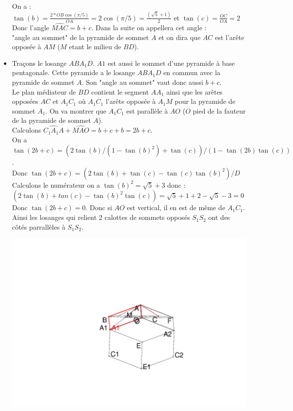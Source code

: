 \documentclass[a4paper,11pt]{book}
\begin{document}
\begin{itemize}
On a :\\
$\tan(b)=\frac{2*OB\cos(\pi/5)}{OA}=2\cos(\pi/5)=\frac{(\sqrt 5+1)}{2}$ et $\tan(c)=\frac{OC}{OA}=2$
Donc l'angle $\widehat{MAC}=b+c$. Dans la suite on appellera cet angle :\\
"angle au sommet" de la pyramide de sommet $A$ et on dira que $AC$ est 
l'ar\^ete oppos\'ee \`a $AM$ ($M$ etant le milieu de $BD$).\\
\item Tra\c{c}ons le losange $ABA_1D$. $A1$ est aussi le sommet d'une pyramide 
\`a base pentagonale. Cette pyramide a le losange $ABA_1D$ en commun avec la 
pyramide de sommet $A$. Son "angle au sommet" vaut donc aussi $b+c$.\\
Le plan m\'ediateur de $BD$ contient le segment $AA_1$ ainsi que les ar\^etes
oppos\'ees $AC$ et $A_1C_1$ o\`u $A_1C_1$ l'ar\^ete oppos\'ee \`a $A_1M$ pour 
la pyramide de sommet $A_1$. On va montrer que 
$A_1C_1$ est parall\`ele \`a $AO$ ($O$ pied de la fauteur de la pyramide de 
sommet $A$).\\
Calculons $\widehat{C_1A_1A}+\widehat{MAO}=b+c+b=2b+c$.\\
On a $\tan(2b+c)=(2\tan(b)/(1-\tan(b)^2)+\tan(c))/(1-\tan(2b)\tan(c))$.\\
Donc $\tan(2b+c)=(2\tan(b)+\tan(c)-\tan(c)\tan(b)^2)/D$
Calculons le num\'erateur on a $\tan(b)^2=\sqrt 5+3$ donc :\\
$(2\tan(b)+tan(c)-\tan(b)^2\tan(c))=\sqrt 5+1+2-\sqrt 5-3=0$\\
Donc $\tan(2b+c)=0$.
Donc si $AO$ est vertical, il en est de m\^eme de $A_1C_1$. Ainsi les losanges 
qui relient 2 calottes de sommets oppos\'es $S_1S_2$ ont des c\^ot\'es 
parrall\`eles \`a $S_1S_2$.\\
\begin{center}\includegraphics[width=\textwidth]{triacon2}\end{center}
\end{itemize}
\end{document}
